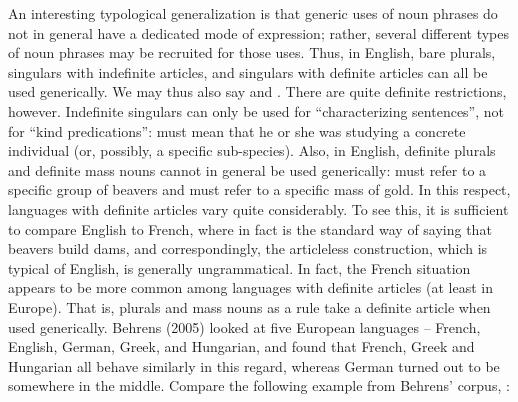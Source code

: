 An interesting typological generalization is that generic uses of noun phrases do not in general have a dedicated mode of expression; rather, several different types of noun phrases may be recruited for those uses. Thus, in English, bare plurals, singulars with indefinite articles, and singulars with definite articles can all be used generically. We may thus also say  and . There are quite definite restrictions, however. Indefinite singulars can only be used for “characterizing sentences”, not for “kind predications”: must mean that he or she was studying a concrete individual (or, possibly, a specific sub-species). Also, in English, definite plurals and definite mass nouns cannot in\textbf{ }general be used generically:  must refer to a specific group of beavers and  must refer to a specific mass of gold. In this respect, languages with definite articles vary quite considerably. To see this, it is sufficient to compare English to French, where in fact  is the standard way of saying that beavers build dams, and correspondingly, the articleless construction, which is typical of English, is generally ungrammatical. In fact, the French situation appears to be more common among languages with definite articles (at least in Europe). That is, plurals and mass nouns as a rule take a definite article when used generically. Behrens (2005) looked at five European languages – French, English, German, Greek, and Hungarian, and found that French, Greek and Hungarian all behave similarly in this regard, whereas German turned out to be somewhere in the middle. Compare the following example from Behrens’ corpus, :

